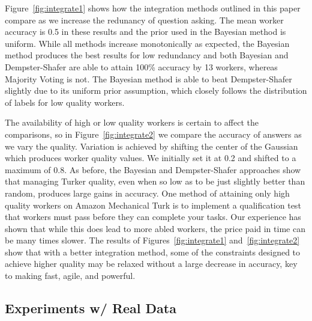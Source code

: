 Figure~\ref{fig:integrate1} shows how the integration methods outlined in this paper compare as we increase the redunancy of question asking.  The mean worker accuracy is 0.5 in these results and the prior used in the Bayesian method is uniform.  While all methods increase monotonically as expected, the Bayesian method produces the best results for low redundancy and both Bayesian and Dempster-Shafer are able to attain 100\% accuracy by 13 workers, whereas Majority Voting is not.  The Bayesian method is able to beat Dempster-Shafer slightly due to its uniform prior assumption, which closely follows the distribution of labels for low quality workers.

The availability of high or low quality workers is certain to affect the comparisons, so in Figure~\ref{fig:integrate2} we compare the accuracy of answers as we vary the quality.  Variation is achieved by shifting the center of the Gaussian which produces worker quality values.  We initially set it at 0.2 and shifted to a maximum of 0.8.  As before, the Bayesian and Dempster-Shafer approaches show that managing Turker quality, even when so low as to be just slightly better than random, produces large gains in accuracy.  One method of attaining only high quality workers on Amazon Mechanical Turk is to implement a qualification test that workers must pass before they can complete your tasks.  Our experience has shown that while this does lead to more abled workers, the price paid in time can be many times slower.  The results of Figures~\ref{fig:integrate1} and~\ref{fig:integrate2} show that with a better integration method, some of the constraints designed to achieve higher quality may be relaxed without a large decrease in accuracy, key to making \sysName fast, agile, and powerful.


\subsection{Experiments w/ Real Data}


